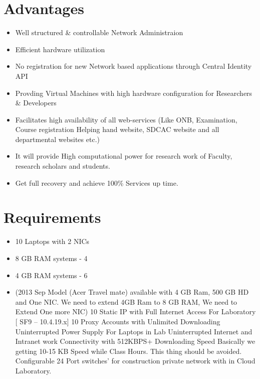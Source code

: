 \documentclass[]{article}
\begin{document}
\section{Advantages}

\begin{itemize}
	\item Well structured \& controllable Network Administraion
	\item Efficient hardware utilization
	\item No registration for new Network based applications through Central Identity API
	\item Provding Virtual Machines with high hardware configuration for Researchers \& Developers
	\item Facilitates high availability of all web-services (Like ONB, Examination, Course registration Helping hand website, SDCAC website and all departmental websites etc.)
	\item It will provide High computational power for research work of Faculty, research scholars and students.
	\item Get full recovery and  achieve 100\% Services up time.
\end{itemize}
\pagebreak

\section{Requirements}
\begin{center}
\begin{itemize}
\item  10 Laptops with 2 NICs
\item  8 GB RAM systems - 4 
\item  4 GB RAM systems - 6  
\item (2013 Sep Model (Acer Travel mate) available with 4 GB Ram, 500 GB HD and One NIC. We need to extend 4GB Ram to 8 GB RAM, We need to Extend One more NIC)
10 Static IP with Full Internet Access For Laboratory [ SF9 – 10.4.19.x]
10 Proxy Accounts with Unlimited Downloading
Uninterrupted Power Supply For Laptops in Lab
Uninterrupted Internet and Intranet work Connectivity with 512KBPS+ Downloading Speed
Basically we getting 10-15 KB Speed while Class Hours. This thing should be avoided.
Configurable 24 Port switches’ for construction private network with in Cloud Laboratory. 
\end{itemize}
\end{center}
\pagebreak
\end{document}
